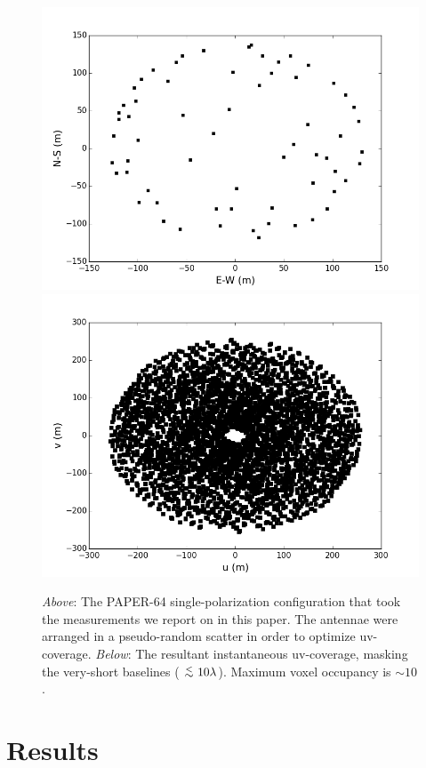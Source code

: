 \documentclass[useAMS,usenatbib]{mn2e}
\newcommand {\aplt} {\ {\raise-.5ex\hbox{$\buildrel<\over\sim$}}\ }
\begin{document}
\begin{figure}
\includegraphics[width=\columnwidth]{figs/psa64imageconfig.png}
\includegraphics[width=\columnwidth]{figs/psa64uvcoverage.png}
\caption{\textit{Above}: The PAPER-64 single-polarization configuration that took the measurements we report on in this paper. The antennae were arranged in a pseudo-random scatter in order to optimize uv-coverage. \textit{Below}: The resultant instantaneous uv-coverage, masking the very-short baselines ($\aplt 10 \lambda$). Maximum voxel occupancy is $\sim10$.}
\label{fig:config}
\end{figure}

\section{Results}
\label{sec:res}
\end{document}
